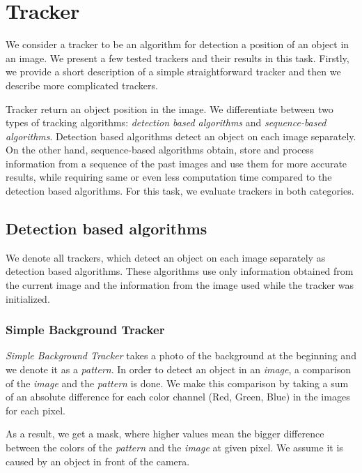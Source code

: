 \chapter{Tracker}

We consider a tracker to be an algorithm for detection a position of an object in
an image. We present a few tested trackers and their results in this task.
Firstly, we provide a short description of a simple straightforward tracker and
then we describe more complicated trackers.

Tracker return an object position in the image. We differentiate between two
types of tracking algorithms: \emph{detection based algorithms} and
\emph{sequence-based algorithms}. Detection based algorithms detect an object
on each image separately. On the other hand, sequence-based algorithms obtain,
store and process information from a sequence of the past images and use them
for more accurate results, while requiring same or even less computation time
compared to the detection based algorithms. For this task, we evaluate
trackers in both categories.


\section {Detection based algorithms}

We denote all trackers, which detect an object on each image separately as
detection based algorithms. These algorithms use only information obtained from
the current image and the information from the image used while the tracker was
initialized.

\subsection{Simple Background Tracker}

\emph{Simple Background Tracker} takes a photo of the background at the
beginning and we denote it as a \emph{pattern}. In order to detect an object in
an \emph{image}, a comparison of the \emph{image} and the \emph{pattern} is done.
We make this comparison by taking a sum of an absolute difference for each
color channel (Red, Green, Blue) in the images for each pixel.

As a result, we get a mask, where higher values mean the bigger difference between
the colors of the \emph{pattern} and the \emph{image} at given pixel. We assume it
is caused by an object in front of the camera.

